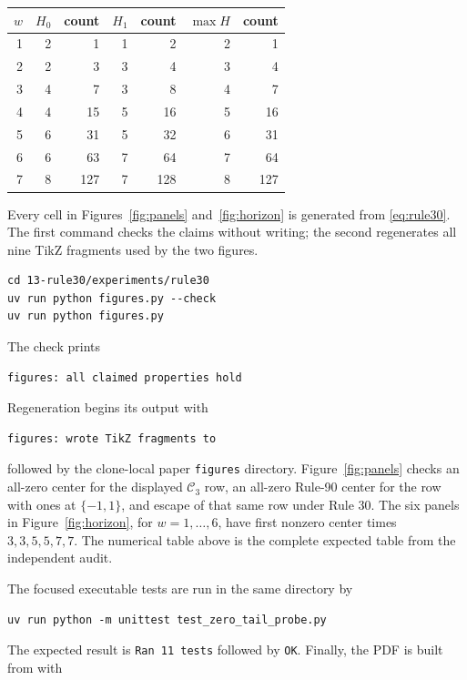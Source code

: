 \documentclass[11pt]{article}
\begin{document}
\begin{center}
\small
\begin{tabular}{@{}rrrrrrr@{}}
\toprule
$w$ & $H_0$ & count & $H_1$ & count & $\max H$ & count\\
\midrule
1&2&1&1&2&2&1\\
2&2&3&3&4&3&4\\
3&4&7&3&8&4&7\\
4&4&15&5&16&5&16\\
5&6&31&5&32&6&31\\
6&6&63&7&64&7&64\\
7&8&127&7&128&8&127\\
\bottomrule
\end{tabular}
\end{center}

Every cell in Figures~\ref{fig:panels} and~\ref{fig:horizon} is generated from
\eqref{eq:rule30}.  The first command checks the claims without writing; the
second regenerates all nine TikZ fragments used by the two figures.

\begin{verbatim}
cd 13-rule30/experiments/rule30
uv run python figures.py --check
uv run python figures.py
\end{verbatim}

The check prints
\begin{verbatim}
figures: all claimed properties hold
\end{verbatim}
Regeneration begins its output with
\begin{verbatim}
figures: wrote TikZ fragments to
\end{verbatim}
followed by the clone-local paper \texttt{figures} directory.
Figure~\ref{fig:panels} checks an all-zero center for the displayed
$\mathcal C_3$ row, an all-zero Rule-90 center for the row with ones at
$\{-1,1\}$, and escape of that same row under Rule 30.  The six panels in
Figure~\ref{fig:horizon}, for $w=1,\ldots,6$, have first nonzero center times
$3,3,5,5,7,7$.  The numerical table above is the complete expected table from
the independent audit.

The focused executable tests are run in the same directory by

\begin{verbatim}
uv run python -m unittest test_zero_tail_probe.py
\end{verbatim}

The expected result is \texttt{Ran 11 tests} followed by \texttt{OK}.  Finally,
the PDF is built from  with
\end{document}
